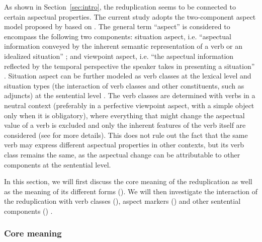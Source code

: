 As shown in Section~\ref{sec:intro}, the reduplication seems to be connected to certain aspectual properties.
The current study adopts the two-component aspect model proposed by \citet{XiaoMcEnery2004} based on \citet{Smith1991}.
The general term ``aspect'' is considered to encompass the following two components:
situation aspect, i.e. ``aspectual information conveyed by the inherent semantic representation of a verb or an idealized situation'' \citep[21]{XiaoMcEnery2004};
and viewpoint aspect, i.e. ``the aspectual information reflected by the temporal perspective the speaker takes in presenting a situation'' \citep[21]{XiaoMcEnery2004}.
Situation aspect can be further modeled as verb classes  at the lexical level
and situation types (the interaction of verb classes and other constituents, such as adjuncts) at the sentential level \citep[33]{XiaoMcEnery2004}.
The verb classes are determined with verbs in a neutral context (preferably in a perfective viewpoint aspect, with a simple object only when it is obligatory),
where everything that might change the aspectual value of a verb is excluded
and only the inherent features of the verb itself are considered
(see \citealt[52]{XiaoMcEnery2004} for more details).
This does not rule out the fact that the same verb may express different aspectual properties in other contexts,
but its verb class remains the same,
as the aspectual change can be attributable to other components at the sentential level.

In this section, we will first discuss the core meaning of the reduplication as well as the meaning of its different forms ().
We will then investigate the interaction of the reduplication with verb classes (), aspect markers () and other sentential components () .

\subsubsection{Core meaning}\label{sec:core-sem}

